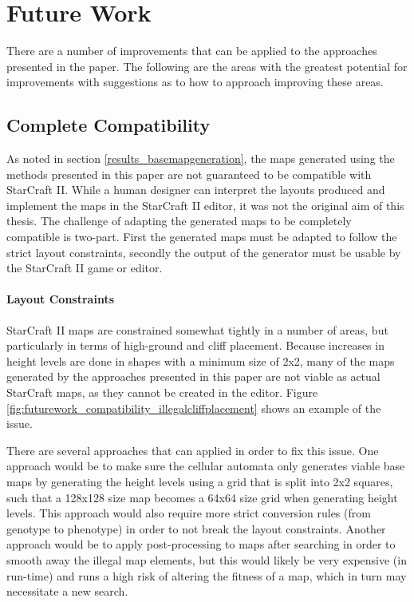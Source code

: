 \chapter{Future Work}
\label{futurework}
There are a number of improvements that can be applied to the approaches presented in the paper. The following are the areas with the greatest potential for improvements with suggestions as to how to approach improving these areas.
\section{Complete Compatibility}
\label{futurework_compatibility}
As noted in section \ref{results_basemapgeneration}, the maps generated using the methods presented in this paper are not guaranteed to be compatible with StarCraft II. While a human designer can interpret the layouts produced and implement the maps in the StarCraft II editor, it was not the original aim of this thesis. The challenge of adapting the generated maps to be completely compatible is two-part. First the generated maps must be adapted to follow the strict layout constraints, secondly the output of the generator must be usable by the StarCraft II game or editor. 

\subsubsection{Layout Constraints}
StarCraft II maps are constrained somewhat tightly in a number of areas, but particularly in terms of high-ground and cliff placement. Because increases in height levels are done in shapes with a minimum size of 2x2, many of the maps generated by the approaches presented in this paper are not viable as actual StarCraft maps, as they cannot be created in the editor. Figure \ref{fig:futurework_compatibility_illegalcliffplacement} shows an example of the issue.


There are several approaches that can applied in order to fix this issue. One approach would be to make sure the cellular automata only generates viable base maps by generating the height levels using a grid that is split into 2x2 squares, such that a 128x128 size map becomes a 64x64 size grid when generating height levels. This approach would also require more strict conversion rules (from genotype to phenotype) in order to not break the layout constraints. Another approach would be to apply post-processing to maps after searching in order to smooth away the illegal map elements, but this would likely be very expensive (in run-time) and runs a high risk of altering the fitness of a map, which in turn may necessitate a new search. 

